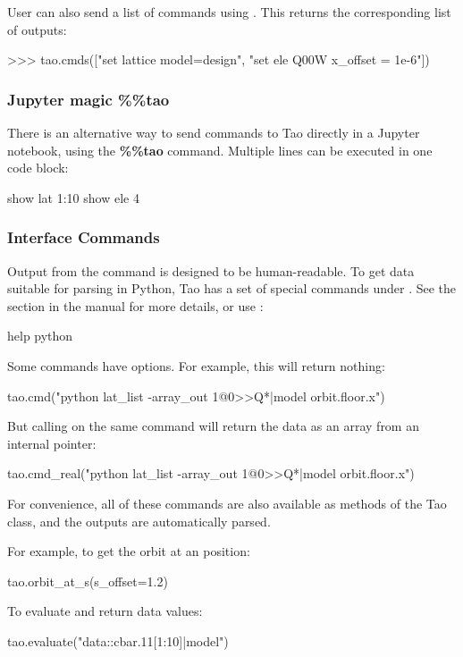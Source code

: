 \documentclass{hitec}     %
\begin{document}
{{{{User can also send a list of commands using . This returns the corresponding list of outputs:
\begin{code}
>>> tao.cmds(["set lattice model=design", "set ele Q00W x_offset = 1e-6"])
\end{code}

\subsubsection{Jupyter magic \%\%tao}
There is an alternative way to send commands to Tao directly in a Jupyter notebook, using the \textbf{\%\%tao} command. Multiple lines can be executed in one code block:
\begin{code}
show lat 1:10
show ele 4
\end{code}

\subsubsection{Interface Commands}
Output from the  command is designed to be human-readable. To get data suitable for parsing in Python, Tao has a set of special commands under . See the  section in the \tao manual for more details, or use :
\begin{code}
help python
\end{code}

Some commands have  options. For example, this will return nothing:
\begin{code}
tao.cmd("python lat_list -array_out 1@0>>Q*|model orbit.floor.x")
\end{code}
But calling  on the same command will return the data as an array from an internal pointer:
\begin{code}
tao.cmd_real("python lat_list -array_out 1@0>>Q*|model orbit.floor.x")
\end{code}

For convenience, all of these commands are also available as methods of the Tao class, and the outputs are automatically parsed.

For example, to get the orbit at an  position:
\begin{code}
tao.orbit_at_s(s_offset=1.2)
\end{code}

To evaluate and return data values:
\begin{code}
tao.evaluate("data::cbar.11[1:10]|model")
\end{code}

}}}}
\end{document}
